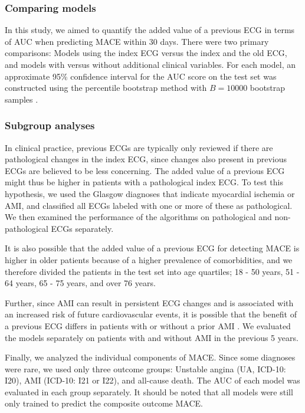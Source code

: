 \documentclass[preprint]{elsarticle}
\begin{document}
\subsubsection{Comparing models}
In this study, we aimed to quantify the added value of a previous ECG in terms of AUC  when predicting MACE within 30 days. There were two primary comparisons: Models using the index ECG versus the index and the old ECG, and models with versus without additional clinical variables. For each model, an approximate 95\% confidence interval for the AUC score on the test set was constructed using the percentile bootstrap method with $B=10000$ bootstrap samples \citep{efron1981}.

\subsubsection{Subgroup analyses}
In clinical practice, previous ECGs are typically only reviewed if there are pathological changes in the index ECG, since changes also present in previous ECGs are believed to be less concerning. The added value of a previous ECG might thus be higher in patients with a pathological index ECG. To test this hypothesis, we used the Glasgow diagnoses that indicate myocardial ischemia or AMI, and classified all ECGs labeled with one or more of these as pathological. We then examined the performance of the algorithms on pathological and non-pathological ECGs separately.

It is also possible that the added value of a previous ECG for detecting MACE is higher in older patients because of a higher prevalence of comorbidities, and we therefore divided the patients in the test set into age quartiles; 18 - 50 years, 51 - 64 years, 65 - 75 years, and over 76 years.

Further, since AMI can result in persistent ECG changes and is associated with an increased risk of future cardiovascular events, it is possible that the benefit of a previous ECG differs in patients with or without a prior AMI \citep{strom2007,sawai2017}. We evaluated the models separately on patients with and without AMI in the previous 5 years.

Finally, we analyzed the individual components of MACE. Since some diagnoses were rare, we used only three outcome groups: Unstable angina (UA, ICD-10: I20), AMI (ICD-10: I21 or I22), and all-cause death. The AUC of each model was evaluated in each group separately. It should be noted that all models were still only trained to predict the composite outcome MACE.
\end{document}
